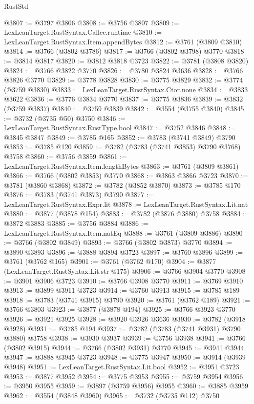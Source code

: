\begin{lexlean}{RustStd}
\begin{coremodule}
@3807 := @3797 @3806
@3808 := @3756 @3807
@3809 := LexLeanTarget.RustSyntax.Callee.runtime
@3810 := LexLeanTarget.RustSyntax.Item.appendBytes
@3812 := @3761 (@3809 @3810)
@3814 := @3766 (@3802 @3786)
@3817 := @3766 (@3802 @3798) @3770
@3818 := @3814 @3817
@3820 := @3812 @3818 @3723
@3822 := @3781 (@3808 @3820)
@3824 := @3766 @3822 @3770
@3826 := @3780 @3824 @3636
@3828 := @3766 @3826 @3770
@3829 := @3778 @3828
@3830 := @3775 @3829
@3832 := @3774 (@3759 @3830)
@3833 := LexLeanTarget.RustSyntax.Ctor.none
@3834 := @3833 @3622
@3836 := @3776 @3834 @3770
@3837 := @3775 @3836
@3839 := @3832 (@3759 @3837)
@3840 := @3759 @3839
@3842 := @3554 (@3755 @3840)
@3845 := @3732 (@3735 @50) @3750
@3846 := LexLeanTarget.RustSyntax.RustType.bool
@3847 := @3752 @3846
@3848 := @3845 @3847
@3849 := @3785 @165
@3852 := @3783 (@3741 @3849) @3790
@3853 := @3785 @120
@3859 := @3782 (@3783 (@3741 @3853) @3790 @3768) @3758
@3860 := @3756 @3859
@3861 := LexLeanTarget.RustSyntax.Item.lengthBytes
@3863 := @3761 (@3809 @3861)
@3866 := @3766 (@3802 @3853) @3770
@3868 := @3863 @3866 @3723
@3870 := @3781 (@3860 @3868)
@3872 := @3782 (@3852 @3870)
@3873 := @3785 @170
@3876 := @3783 (@3741 @3873) @3790
@3877 := LexLeanTarget.RustSyntax.Expr.lit
@3878 := LexLeanTarget.RustSyntax.Lit.nat
@3880 := @3877 (@3878 @154)
@3883 := @3782 (@3876 @3880) @3758
@3884 := @3872 @3883
@3885 := @3756 @3884
@3886 := LexLeanTarget.RustSyntax.Item.natEq
@3888 := @3761 (@3809 @3886)
@3890 := @3766 (@3802 @3849)
@3893 := @3766 (@3802 @3873) @3770
@3894 := @3890 @3893
@3896 := @3888 @3894 @3723
@3897 := @3760 @3896
@3899 := @3761 (@3762 @165)
@3901 := @3761 (@3762 @170)
@3904 := @3877 (LexLeanTarget.RustSyntax.Lit.str @175)
@3906 := @3766 @3904 @3770
@3908 := @3901 @3906 @3723
@3910 := @3766 @3908 @3770
@3911 := @3769 @3910
@3913 := @3899 @3911 @3723
@3914 := @3760 @3913
@3915 := @3785 @189
@3918 := @3783 (@3741 @3915) @3790
@3920 := @3761 (@3762 @189)
@3921 := @3766 @3803
@3923 := @3877 (@3878 @194)
@3925 := @3766 @3923 @3770
@3926 := @3921 @3925
@3928 := @3920 @3926 @3636
@3930 := @3782 (@3918 @3928)
@3931 := @3785 @194
@3937 := @3782 (@3783 (@3741 @3931) @3790 @3880) @3758
@3938 := @3930 @3937
@3939 := @3756 @3938
@3941 := @3766 (@3802 @3915)
@3944 := @3766 (@3802 @3931) @3770
@3945 := @3941 @3944
@3947 := @3888 @3945 @3723
@3948 := @3775 @3947
@3950 := @3914 (@3939 @3948)
@3951 := LexLeanTarget.RustSyntax.Lit.bool
@3952 := @3951 @3723
@3953 := @3877 @3952
@3954 := @3775 @3953
@3955 := @3759 @3954
@3956 := @3950 @3955
@3959 := @3897 (@3759 @3956) @3955
@3960 := @3885 @3959
@3962 := @3554 (@3848 @3960)
@3965 := @3732 (@3735 @112) @3750

\end{coremodule}
\end{lexlean}
